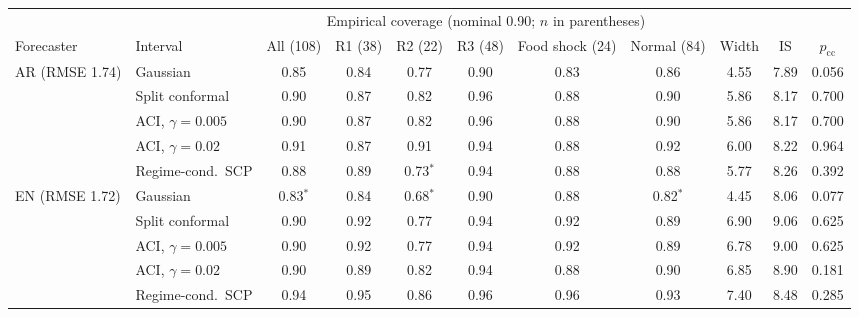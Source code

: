 \begin{tabular}{llccccccccc}
\toprule
 & & \multicolumn{6}{c}{Empirical coverage (nominal 0.90; $n$ in parentheses)} & & & \\
\cmidrule(lr){3-8}
Forecaster & Interval & All (108) & R1 (38) & R2 (22) & R3 (48) & Food shock (24) & Normal (84) & Width & IS & $p_{\mathrm{cc}}$ \\
\midrule
AR (RMSE 1.74) & Gaussian & 0.85 & 0.84 & 0.77 & 0.90 & 0.83 & 0.86 & 4.55 & 7.89 & 0.056 \\
 & Split conformal & 0.90 & 0.87 & 0.82 & 0.96 & 0.88 & 0.90 & 5.86 & 8.17 & 0.700 \\
 & ACI, $\gamma=0.005$ & 0.90 & 0.87 & 0.82 & 0.96 & 0.88 & 0.90 & 5.86 & 8.17 & 0.700 \\
 & ACI, $\gamma=0.02$ & 0.91 & 0.87 & 0.91 & 0.94 & 0.88 & 0.92 & 6.00 & 8.22 & 0.964 \\
 & Regime-cond.\ SCP & 0.88 & 0.89 & 0.73$^{*}$ & 0.94 & 0.88 & 0.88 & 5.77 & 8.26 & 0.392 \\
\midrule
EN (RMSE 1.72) & Gaussian & 0.83$^{*}$ & 0.84 & 0.68$^{*}$ & 0.90 & 0.88 & 0.82$^{*}$ & 4.45 & 8.06 & 0.077 \\
 & Split conformal & 0.90 & 0.92 & 0.77 & 0.94 & 0.92 & 0.89 & 6.90 & 9.06 & 0.625 \\
 & ACI, $\gamma=0.005$ & 0.90 & 0.92 & 0.77 & 0.94 & 0.92 & 0.89 & 6.78 & 9.00 & 0.625 \\
 & ACI, $\gamma=0.02$ & 0.90 & 0.89 & 0.82 & 0.94 & 0.88 & 0.90 & 6.85 & 8.90 & 0.181 \\
 & Regime-cond.\ SCP & 0.94 & 0.95 & 0.86 & 0.96 & 0.96 & 0.93 & 7.40 & 8.48 & 0.285 \\
\bottomrule
\end{tabular}
